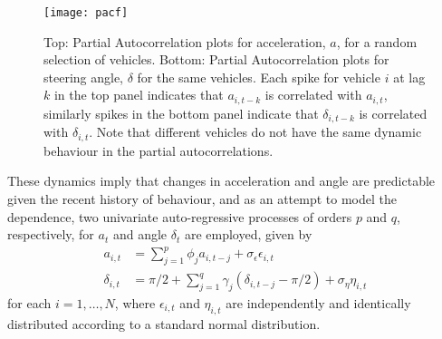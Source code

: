 \documentclass[12pt,a4paper]{article}\usepackage[]{graphicx}\usepackage[]{color}
\begin{document}
\begin{figure}
\centering
\texttt{[image: pacf]}
\caption{Top: Partial Autocorrelation plots for acceleration, $a$, for a random selection of vehicles. Bottom: Partial Autocorrelation plots for steering angle, $\delta$ for the same vehicles. Each spike for vehicle $i$ at lag $k$ in the top panel indicates that $a_{i, t-k}$ is correlated with $a_{i, t}$, similarly spikes in the bottom panel indicate that $\delta_{i, t-k}$ is correlated with $\delta_{i, t}$. Note that different vehicles do not have the same dynamic behaviour in the partial autocorrelations.}
\label{fig:pacf}
\end{figure}

These dynamics imply that changes in acceleration and angle are predictable given the recent history of behaviour, and as an attempt to model the dependence, two univariate auto-regressive processes of orders $p$ and $q$, respectively, for $a_t$ and angle  $\delta_t$ are employed, given by
\begin{align}
a_{i, t} &= \sum_{j = 1}^p \phi_{j} a_{i, t-j} + \sigma_{\epsilon} \epsilon_{i, t} \label{aAR} \\
\delta_{i, t} &= \pi/2 + \sum_{j = 1}^q \gamma_{j} (\delta_{i, t-j} - \pi/2) + \sigma_{\eta} \eta_{i, t} \label{dAR}
\end{align}
for each $i = 1, \dots, N$, where $\epsilon_{i, t}$ and $\eta_{i, t}$ are independently and identically distributed according to a standard normal distribution. 
\\
\end{document}
